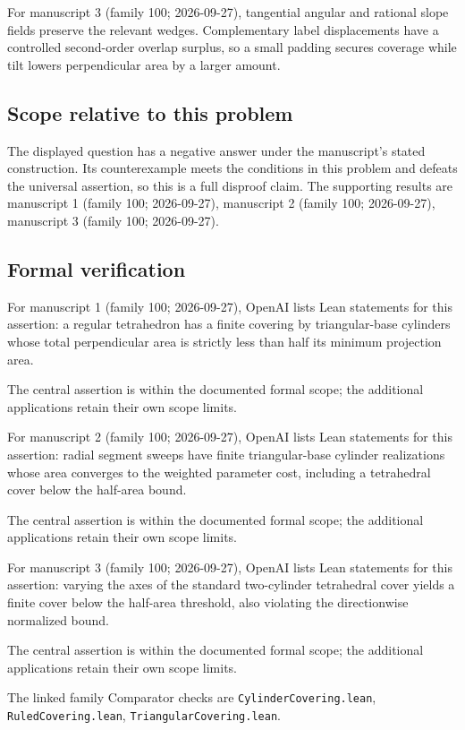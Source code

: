 \documentclass[11pt]{article}
\begin{document}
For manuscript 3 (family 100; 2026-09-27), tangential angular and rational slope fields preserve the relevant wedges. Complementary label displacements have a controlled second-order overlap surplus, so a small padding secures coverage while tilt lowers perpendicular area by a larger amount.

\subsection{Scope relative to this problem}
The displayed question has a negative answer under the manuscript's stated construction. Its counterexample meets the conditions in this problem and defeats the universal assertion, so this is a full disproof claim. The supporting results are manuscript 1 (family 100; 2026-09-27), manuscript 2 (family 100; 2026-09-27), manuscript 3 (family 100; 2026-09-27).

\subsection{Formal verification}
For manuscript 1 (family 100; 2026-09-27), OpenAI lists Lean statements for this assertion: a regular tetrahedron has a finite covering by triangular-base cylinders whose total perpendicular area is strictly less than half its minimum projection area.

The central assertion is within the documented formal scope; the additional applications retain their own scope limits.

For manuscript 2 (family 100; 2026-09-27), OpenAI lists Lean statements for this assertion: radial segment sweeps have finite triangular-base cylinder realizations whose area converges to the weighted parameter cost, including a tetrahedral cover below the half-area bound.

The central assertion is within the documented formal scope; the additional applications retain their own scope limits.

For manuscript 3 (family 100; 2026-09-27), OpenAI lists Lean statements for this assertion: varying the axes of the standard two-cylinder tetrahedral cover yields a finite cover below the half-area threshold, also violating the directionwise normalized bound.

The central assertion is within the documented formal scope; the additional applications retain their own scope limits.

The linked family Comparator checks are \texttt{CylinderCovering.lean}, \texttt{RuledCovering.lean}, \texttt{TriangularCovering.lean}.
\end{document}
